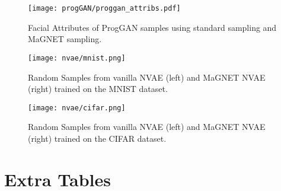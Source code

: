 \begin{figure}[t!]
    \centering
    \texttt{[image: progGAN/proggan\_attribs.pdf]}
    \small
    \caption{Facial Attributes of  ProgGAN samples using standard sampling and MaGNET sampling.}
    \label{fig:stylegan2_attributes}
\end{figure}

\newpage

\begin{figure}[h]
    \centering
    \texttt{[image: nvae/mnist.png]}
    \caption{Random Samples from vanilla NVAE (left) and MaGNET NVAE (right) trained on the MNIST dataset.}
    \label{fig:mnistnvae}
\end{figure}


\begin{figure}[h]
    \centering
    \texttt{[image: nvae/cifar.png]}
    \caption{Random Samples from vanilla NVAE (left) and MaGNET NVAE (right) trained on the CIFAR dataset.}
    \label{fig:cifarnvae}
\end{figure}

\clearpage





\section{Extra Tables}
\label{appendix:tables}

